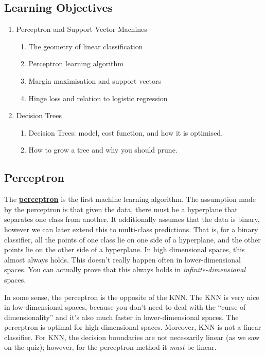 \documentclass[11pt]{scrartcl}
\theoremstyle{definition}
\theoremstyle{remark}
\newcommand{\dfn}[1]{\textbf{\underline{#1}}}
\begin{document}
\subsection{Learning Objectives}
\begin{enumerate}[noitemsep]
	\item Perceptron and Support Vector Machines 
	\begin{enumerate}[noitemsep]
		\item The geometry of linear classification
		\item Perceptron learning algorithm
		\item Margin maximisation and support vectors 
		\item Hinge loss and relation to logistic regression 
	\end{enumerate}
	\item Decision Trees
	\begin{enumerate}[noitemsep]
		\item Decision Trees: model, cost function, and how it is optimised. 
		\item How to grow a tree and why you should prune. 
	\end{enumerate}
\end{enumerate}

\subsection{Perceptron}
The \dfn{perceptron} is the first machine learning algorithm. The assumption made by the perceptron is that given the data, there must be a hyperplane that separates one class from another. It additionally assumes that the data is binary, however we can later extend this to multi-class predictions. That is, for a binary classifier, all the points of one class lie on one side of a hyperplane, and the other points lie on the other side of a hyperplane. In high dimensional spaces, this almost always holds. This doesn't really happen often in lower-dimensional spaces. You can actually prove that this always holds in \emph{infinite-dimensional} spaces. 

In some sense, the perceptron is the opposite of the KNN. The KNN is very nice in low-dimensional spaces, because you don't need to deal with the ``curse of dimensionality'' and it's also much faster in lower-dimensional spaces. The perceptron is optimal for high-dimensional spaces. Moreover, KNN is not a linear classifier. For KNN, the decision boundaries are not necessarily linear (as we saw on the quiz); however, for the perceptron method it \emph{must} be linear. 
\end{document}
